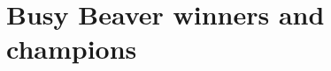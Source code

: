 \documentclass[letterpaper,british,11pt]{article}
\theoremstyle{definition} %
\numberwithin{equation}{section}
\theoremstyle{definition} %
\begin{document}



\newpage

\vspace*{-5em}
\section{Busy Beaver winners and champions}\label{app:lowerbounds}
\end{document}
